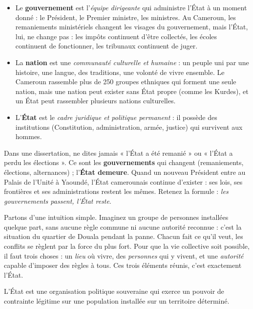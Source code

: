 \documentclass[11pt]{article}
\newcommand{\cle}[1]{{\popxbold\color{popdark}#1}}
\newcounter{popsec}
\newcounter{popsub}
\newcommand{\courssub}[1]{%
  \stepcounter{popsub}%
  \par\vspace{9pt}\noindent{\popxbold\fontsize{11.5}{13}\selectfont\color{popink}{\color{poporange}\thepopsec.\thepopsub}\hspace{6pt}#1}\par\nopagebreak\vspace{4pt}
}
\begin{document}
\begin{itemize}
\item Le \textbf{gouvernement} est l'\emph{équipe dirigeante} qui administre l'État à un moment donné : le Président, le Premier ministre, les ministres. Au Cameroun, les remaniements ministériels changent les visages du gouvernement, mais l'État, lui, ne change pas : les impôts continuent d'être collectés, les écoles continuent de fonctionner, les tribunaux continuent de juger.
\item La \textbf{nation} est une \emph{communauté culturelle et humaine} : un peuple uni par une histoire, une langue, des traditions, une volonté de vivre ensemble. Le Cameroun rassemble plus de 250 groupes ethniques qui forment une seule nation, mais une nation peut exister sans État propre (comme les Kurdes), et un État peut rassembler plusieurs nations culturelles.
\item L'\textbf{État} est le \emph{cadre juridique et politique permanent} : il possède des institutions (Constitution, administration, armée, justice) qui survivent aux hommes.
\end{itemize}

\begin{attention}
Dans une dissertation, ne dites jamais « l'État a été remanié » ou « l'État a perdu les élections ». Ce sont les \textbf{gouvernements} qui changent (remaniements, élections, alternances) ; l'\textbf{État demeure}. Quand un nouveau Président entre au Palais de l'Unité à Yaoundé, l'État camerounais continue d'exister : ses lois, ses frontières et ses administrations restent les mêmes. Retenez la formule : \emph{les gouvernements passent, l'État reste}.
\end{attention}

\courssub{Définition philosophique de l'État}

Partons d'une intuition simple. Imaginez un groupe de personnes installées quelque part, sans aucune règle commune ni aucune autorité reconnue : c'est la situation du quartier de Douala pendant la panne. Chacun fait ce qu'il veut, les conflits se règlent par la force du plus fort. Pour que la vie collective soit possible, il faut trois choses : un \emph{lieu} où vivre, des \emph{personnes} qui y vivent, et une \emph{autorité} capable d'imposer des règles à tous. Ces trois éléments réunis, c'est exactement l'État.

\begin{definition}[L'État]
L'\cle{État} est une organisation politique \cle{souveraine} qui exerce un pouvoir de contrainte légitime sur une \cle{population} installée sur un \cle{territoire} déterminé.
\end{definition}
\end{document}
